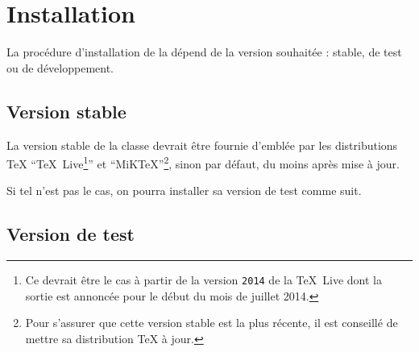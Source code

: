 \chapter{Installation}
\label{cha:installation}
\lstset{%
  basicstyle=\ttfamily\NoAutoSpacing,
  columns=flexible,
  frame=single
}%
La procédure d'installation de la \yatcl{} dépend de la version souhaitée :
stable, de test ou de développement.

\section{Version stable}
\label{sec:version-stable}

La version stable de la classe devrait être fournie d'emblée par les
distributions \TeX{} \enquote{\TeX~Live\footnote{Ce devrait être le cas
    à partir de la version \texttt{2014} de la \TeX~Live dont la sortie est
    annoncée pour le début du mois de juillet 2014.}} et
\enquote{MiK\TeX{}}\footnote{Pour s'assurer que cette version stable est la
  plus récente, il est conseillé de mettre sa distribution \TeX{} à jour.},
sinon par défaut, du moins après mise à jour.

Si tel n'est pas le cas, on pourra installer sa version de test comme suit.

\section{Version de test}
\label{sec:version-de-test}

